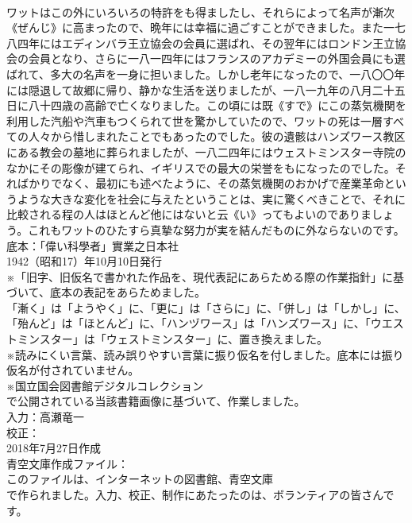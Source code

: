 \documentclass[8pt]{extreport}
\begin{document}
\begin{CJK}{UTF8}{min}
\\	ワットはこの外にいろいろの特許をも得ましたし、それらによって名声が漸次《ぜんじ》に高まったので、晩年には幸福に過ごすことができました。また一七八四年にはエディンバラ王立協会の会員に選ばれ、その翌年にはロンドン王立協会の会員となり、さらに一八一四年にはフランスのアカデミーの外国会員にも選ばれて、多大の名声を一身に担いました。しかし老年になったので、一八〇〇年には隠退して故郷に帰り、静かな生活を送りましたが、一八一九年の八月二十五日に八十四歳の高齢で亡くなりました。この頃には既《すで》にこの蒸気機関を利用した汽船や汽車もつくられて世を驚かしていたので、ワットの死は一層すべての人々から惜しまれたことでもあったのでした。彼の遺骸はハンズワース教区にある教会の墓地に葬られましたが、一八二四年にはウェストミンスター寺院のなかにその彫像が建てられ、イギリスでの最大の栄誉をもになったのでした。そればかりでなく、最初にも述べたように、その蒸気機関のおかげで産業革命というような大きな変化を社会に与えたということは、実に驚くべきことで、それに比較される程の人はほとんど他にはないと云《い》ってもよいのでありましょう。これもワットのひたすら真摯な努力が実を結んだものに外ならないのです。
\\	底本：「偉い科學者」實業之日本社
\\	1942（昭和17）年10月10日発行
\\	※「旧字、旧仮名で書かれた作品を、現代表記にあらためる際の作業指針」に基づいて、底本の表記をあらためました。
\\	「漸く」は「ようやく」に、「更に」は「さらに」に、「併し」は「しかし」に、「殆んど」は「ほとんど」に、「ハンヅワース」は「ハンズワース」に、「ウエストミンスター」は「ウェストミンスター」に、置き換えました。
\\	※読みにくい言葉、読み誤りやすい言葉に振り仮名を付しました。底本には振り仮名が付されていません。
\\	※国立国会図書館デジタルコレクション
\\	で公開されている当該書籍画像に基づいて、作業しました。
\\	入力：高瀬竜一
\\	校正：
\\	2018年7月27日作成
\\	青空文庫作成ファイル：
\\	このファイルは、インターネットの図書館、青空文庫
\\	で作られました。入力、校正、制作にあたったのは、ボランティアの皆さんです。
\end{CJK}
\end{document}
